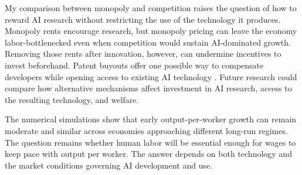 My comparison between monopoly and competition raises the question of how to
reward AI research without restricting the use of the technology it produces.
Monopoly rents encourage research, but monopoly pricing can leave the economy
labor-bottlenecked even when competition would sustain AI-dominated growth.
Removing those rents after innovation, however, can undermine incentives to
invest beforehand. Patent buyouts offer one possible way to compensate
developers while opening access to existing AI technology \citep{kremer1998}.
Future research could compare how alternative mechanisms affect investment
in AI research, access to the resulting technology, and welfare.

The numerical simulations show that early output-per-worker growth can remain moderate and similar across economies approaching different long-run regimes. The question remains whether human labor will be essential enough for wages to keep pace with output per worker. The answer depends on both technology and the market conditions governing AI development and use.






